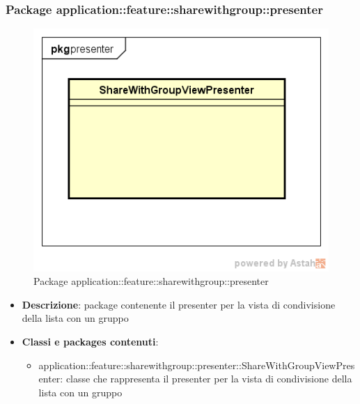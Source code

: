 \subsubsection{Package application::feature::sharewithgroup::presenter}
\label{Package application::feature::sharewithgroup::presenter}
\begin{figure}[H]
	\centering
	\includegraphics[scale=0.5]{Sezioni/Packages/Application/share_with_group_presenter.png}
	\caption{Package application::feature::sharewithgroup::presenter}
\end{figure}
\begin{itemize}
	\item \textbf{Descrizione}: package contenente il presenter per la vista di condivisione della lista con un gruppo
	\item \textbf{Classi e packages contenuti}:
	\begin{itemize}
	\item application::feature::sharewithgroup::presenter::ShareWithGroupViewPresenter: classe che rappresenta il presenter per la vista di condivisione della lista con un gruppo
	\end{itemize}
\end{itemize}


